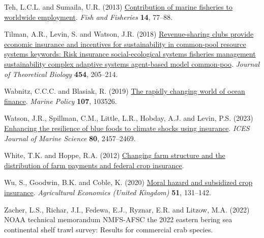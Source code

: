 \documentclass[
  letterpaper,
  DIV=11,
  numbers=noendperiod]{scrartcl}
\newlength{\cslhangindent}
\newlength{\cslentryspacingunit} %
\newenvironment{CSLReferences}[2] %
 {%
  \setlength{\parindent}{0pt}
  \ifodd #1
  \let\oldpar\par
  \def\par{\hangindent=\cslhangindent\oldpar}
  \fi
  \setlength{\parskip}{#2\cslentryspacingunit}
 }%
 {}
\theoremstyle{plain}
\theoremstyle{plain}
\theoremstyle{remark}
\begin{document}
\begin{CSLReferences}{1}{0}
\leavevmode{}%
Teh, L.C.L. and Sumaila, U.R. (2013)
\href{https://doi.org/10.1111/j.1467-2979.2011.00450.x}{Contribution of
marine fisheries to worldwide employment}. \emph{Fish and Fisheries}
\textbf{14}, 77--88.

\leavevmode{}%
Tilman, A.R., Levin, S. and Watson, J.R. (2018)
\href{https://doi.org/10.1016/j.jtbi.2018.06.003}{Revenue-sharing clubs
provide economic insurance and incentives for sustainability in
common-pool resource systems keywords: Risk insurance social-ecological
systems fisheries management sustainability complex adaptive systems
agent-based model common-poo}. \emph{Journal of Theoretical Biology}
\textbf{454}, 205--214.

\leavevmode{}%
Wabnitz, C.C.C. and Blasiak, R. (2019)
\href{https://doi.org/10.1016/j.marpol.2019.103526}{The rapidly changing
world of ocean finance}. \emph{Marine Policy} \textbf{107}, 103526.

\leavevmode{}%
Watson, J.R., Spillman, C.M., Little, L.R., Hobday, A.J. and Levin, P.S.
(2023) \href{https://doi.org/10.1093/icesjms/fsad175}{Enhancing the
resilience of blue foods to climate shocks using insurance}. \emph{ICES
Journal of Marine Science} \textbf{80}, 2457--2469.

\leavevmode{}%
White, T.K. and Hoppe, R.A. (2012)
\href{https://www.ers.usda.gov}{Changing farm structure and the
distribution of farm payments and federal crop insurance}.

\leavevmode{}%
Wu, S., Goodwin, B.K. and Coble, K. (2020)
\href{https://doi.org/10.1111/agec.12545}{Moral hazard and subsidized
crop insurance}. \emph{Agricultural Economics (United Kingdom)}
\textbf{51}, 131--142.

\leavevmode{}%
Zacher, L.S., Richar, J.I., Fedewa, E.J., Ryznar, E.R. and Litzow, M.A.
(2022) NOAA technical memorandum NMFS-AFSC the 2022 eastern bering sea
continental shelf trawl survey: Results for commercial crab species.

\end{CSLReferences}
\end{document}
